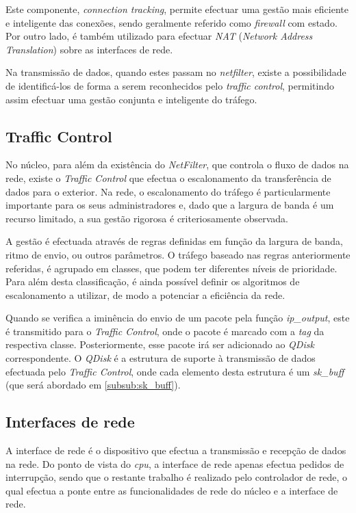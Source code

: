 Este componente, \textit{connection tracking}, permite efectuar uma gestão mais eficiente e inteligente das conexões, sendo geralmente referido como \textit{firewall} com estado.
Por outro lado, é também utilizado para efectuar \textit{NAT} (\textit{Network Address Translation}) sobre as interfaces de rede.

Na transmissão de dados, quando estes passam no \textit{netfilter}, existe a possibilidade de identificá-los de forma a serem reconhecidos pelo \textit{traffic control}, permitindo assim efectuar uma gestão conjunta e inteligente do tráfego.

\subsection{Traffic Control}
\label{sub:traffic_control}

No núcleo, para além da existência do \textit{NetFilter}, que controla o fluxo de dados na rede, existe o \textit{Traffic Control} que efectua o escalonamento da transferência de dados para o exterior.
Na rede, o escalonamento do tráfego é particularmente importante para os seus administradores e, dado que a largura de banda é um recurso limitado, a sua gestão rigorosa é criteriosamente observada.

A gestão é efectuada através de regras definidas em função da largura de banda, ritmo de envio, ou outros parâmetros.
O tráfego baseado nas regras anteriormente referidas, é agrupado em classes, que podem ter diferentes níveis de prioridade.
Para além desta classificação, é ainda possível definir os algoritmos de escalonamento a utilizar, de modo a potenciar a eficiência da rede.

Quando se verifica a iminência do envio de um pacote pela função \textit{ip\_output}, este é transmitido para o \textit{Traffic Control}, onde o pacote é marcado com a \textit{tag} da respectiva classe.
Posteriormente, esse pacote irá ser adicionado ao \textit{QDisk} correspondente.
O \textit{QDisk} é a estrutura de suporte à transmissão de dados efectuada pelo \textit{Traffic Control}, onde cada elemento desta estrutura é um \textit{sk\_buff} (que será abordado em \ref{subsub:sk_buff}).


\subsection{Interfaces de rede}

A interface de rede é o dispositivo que efectua a transmissão e recepção de dados na rede.
Do ponto de vista do \textit{cpu}, a interface de rede apenas efectua pedidos de interrupção, sendo que o restante trabalho é realizado pelo controlador de rede, o qual efectua a ponte entre as funcionalidades de rede do núcleo e a interface de rede.

